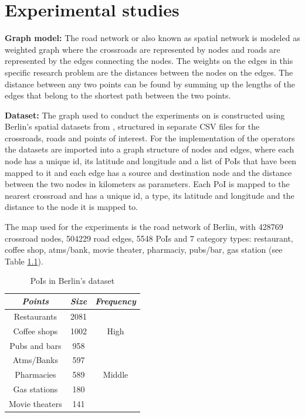 \chapter{Experimental studies}
\label{sec:evaluation}

\textbf{Graph model:}
The road network or also known as spatial network is modeled as weighted graph where the crossroads are represented by nodes and roads are represented by the edges connecting the nodes. The weights on the edges in this specific research problem are the distances between the nodes on the edges. The distance between any two points can be found by summing up the lengths of the edges that belong to the shortest path between the two points.

\textbf{Dataset:}
The graph used to conduct the experiments on is constructed using Berlin's spatial datasets from \cite{datasets}, structured in separate CSV files for the crossroads, roads and points of interest. For the implementation of the operators the datasets are imported into a graph structure of nodes and edges, where each node has a unique id, its latitude and longitude and a list of PoIs that have been mapped to it and each edge has a source and destination node and the distance between the two nodes in kilometers as parameters. Each PoI is mapped to the nearest crossroad and has a unique id, a type, its latitude and longitude and the distance to the node it is mapped to.

The map used for the experiments is the road network of Berlin, with 428769 crossroad nodes, 504229 road edges, 5548 PoIs and 7 category types: restaurant, coffee shop, atms/bank, movie theater, pharmaciy, pubs/bar, gas station (see Table \ref{dataset}). 

\begin{table}[H]
	\centering
	\begin{tabular}{ |c|c|c| } 
		\hline
		\textit{Points} & \textit{Size} & \textit{Frequency}\\
		\hline
		Restaurants & 2081 & \multirow{3}{3em}{High}\\ 
		Coffee shops & 1002 &\\
		Pubs and bars & 958 &\\  
		\hline
		Atms/Banks & 597 & \multirow{3}{3em}{Middle}\\
		Pharmacies & 589 &\\
		\hline
		Gas stations & 180 & \multirow{3}{3em}{Low}\\
		Movie theaters & 141 &\\ 
		\hline
	\end{tabular}
	\caption{PoIs in Berlin's dataset}
	\label{dataset}
\end{table}

